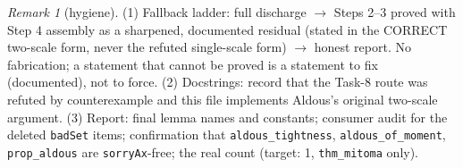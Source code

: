 \documentclass[11pt]{article}
\theoremstyle{plain}
\theoremstyle{remark}
\newtheorem{remark}{Remark}
\begin{document}
\begin{remark}[hygiene]
(1) Fallback ladder: full discharge $\to$ Steps 2--3 proved with Step 4
assembly as a sharpened, documented residual (stated in the CORRECT
two-scale form, never the refuted single-scale form) $\to$ honest report.
No fabrication; a statement that cannot be proved is a statement to fix
(documented), not to force.
(2) Docstrings: record that the Task-8 route was refuted by counterexample
and this file implements Aldous's original two-scale argument.
(3) Report: final lemma names and constants; consumer audit for the deleted
\texttt{badSet} items; confirmation that \texttt{aldous\_tightness},
\texttt{aldous\_of\_moment}, \texttt{prop\_aldous} are \texttt{sorryAx}-free;
the real count (target: 1, \texttt{thm\_mitoma} only).
\end{remark}
\end{document}
